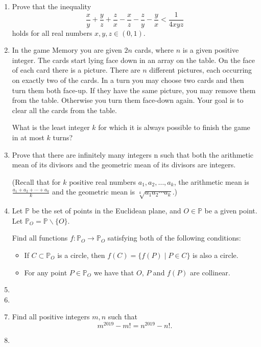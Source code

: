 \documentclass{article}
\begin{document}
\begin{enumerate}[1.]

\vspace{6pt}
\item %
Prove that the inequality \[ \frac{x}{y} +\frac{y}{z} +\frac{z}{x} -\frac{x}{z} -\frac{z}{y} -\frac{y}{x} < \frac{1}{4xyz} \] holds for all real numbers $x,y,z \in (0,1)$.


\vspace{6pt}
\item %
In the game Memory you are given $2n$ cards, where $n$ is a given positive integer. The cards start lying face down in an array on the table. On the face of each card there is a picture. There are $n$ different pictures, each occurring on exactly two of the cards. In a turn you may choose two cards and then turn them both face-up. If they have the same picture, you may remove them from the table. Otherwise you turn them face-down again. Your goal is to clear all the cards from the table.

What is the least integer $k$ for which it is always possible to finish the game in at most $k$ turns?


\vspace{6pt}
\item %
Prove that there are infinitely many integers n such that both the arithmetic mean of its divisors and the geometric mean of its divisors are integers.

(Recall that for $k$ positive real numbers $a_1, a_2, \dotsc, a_k$, the arithmetic mean is $\frac{a_1 +a_2 +\dotsb +a_k}{k}$ and the geometric mean is $\sqrt[k]{a_1 a_2 \dotsm a_k}$.)


\vspace{6pt}
\item %
Let $\mathbb{P}$ be the set of points in the Euclidean plane, and $O \in \mathbb{P}$ be a given point. Let $\mathbb{P}_O = \mathbb{P} \backslash \{O\}$.

Find all functions $f : \mathbb{P}_O \to \mathbb{P}_O$ satisfying both of the following conditions:
\begin{itemize}
  \item If $C \subset \mathbb{P}_O$ is a circle, then $f(C) = \{ f(P) \mid P \in C \}$ is also a circle.
  \item For any point $P \in \mathbb{P}_O$ we have that $O$, $P$ and $f(P)$ are collinear.
\end{itemize}


\vspace{6pt}
\item


\vspace{6pt}
\item


\vspace{6pt}
\item %

Find all positive integers $m, n$ such that
$$ m^{2019} - m! = n^{2019} - n! . $$


\vspace{6pt}
\item


\end{enumerate}
\end{document}
